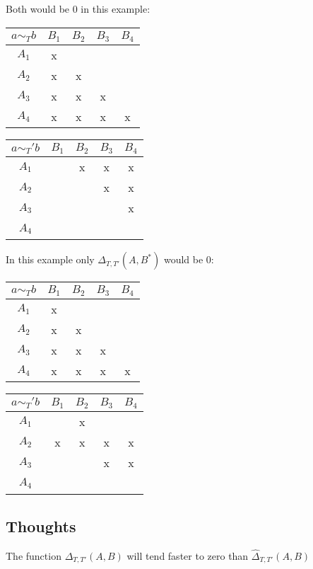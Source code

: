 Both would be $0$ in this example:

\begin{center}
\begin{tabular}{c||c|c|c|c}
$a \sim_T b$ & $B_1$ & $B_2$ & $B_3$ & $B_4$ \\\hline\hline
 $A_1$ & x & ~ & ~ & ~ \\
 $A_2$ & x & x & ~ & ~ \\
 $A_3$ & x & x & x & ~ \\
 $A_4$ & x & x & x & x \\
\end{tabular}
\hspace{1cm}
\begin{tabular}{c||c|c|c|c}
$a \sim_T' b$ & $B_1$ & $B_2$ & $B_3$ & $B_4$ \\\hline\hline
 $A_1$ & ~ & x & x & x \\
 $A_2$ & ~ & ~ & x & x \\
 $A_3$ & ~ & ~ & ~ & x \\
 $A_4$ & ~ & ~ & ~ & ~ \\
\end{tabular}
\end{center}

In this example only $\Delta_{T, T'}(A,B^*)$ would be $0$:

\begin{center}
\begin{tabular}{c||c|c|c|c}
$a \sim_T b$ & $B_1$ & $B_2$ & $B_3$ & $B_4$ \\\hline\hline
 $A_1$ & x & ~ & ~ & ~ \\
 $A_2$ & x & x & ~ & ~ \\
 $A_3$ & x & x & x & ~ \\
 $A_4$ & x & x & x & x \\
\end{tabular}
\hspace{1cm}
\begin{tabular}{c||c|c|c|c}
$a \sim_T' b$ & $B_1$ & $B_2$ & $B_3$ & $B_4$ \\\hline\hline
 $A_1$ & ~ & x & ~ & ~ \\
 $A_2$ & x & x & x & x \\
 $A_3$ & ~ & ~ & x & x \\
 $A_4$ & ~ & ~ & ~ & ~ \\
\end{tabular}
\end{center}

\subsection{Thoughts}
The function $\Delta_{T,T'}(A, B)$ will tend faster to zero than $\hat{\Delta}_{T,T'}(A, B)$


